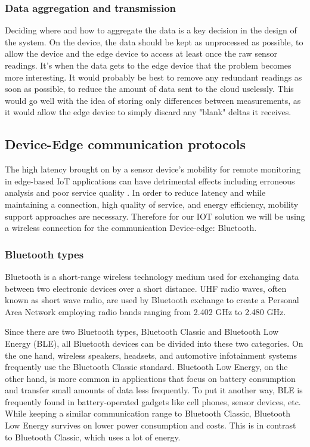 \subsubsection*{Data aggregation and transmission}
Deciding where and how to aggregate the data is a key decision in the design of the
system. On the device, the data should be kept as unprocessed as possible, to allow the device
and the edge device to access at least once the raw sensor readings. It's when the data
gets to the edge device that the problem becomes more interesting. It would probably
be best to remove any redundant readings as soon as possible, to reduce the amount of
data sent to the cloud uselessly. This would go well with the idea of storing only
differences between measurements, as it would allow the edge device to simply discard
any "blank" deltas it receives.

\subsection{Device-Edge communication protocols}
The high latency brought on by a sensor device's mobility for remote monitoring in edge-based IoT applications can have detrimental effects including erroneous analysis and poor service quality \cite{b5}. In order to reduce latency and while maintaining a connection, high quality of service, and energy efficiency, mobility support approaches are necessary. Therefore for our IOT solution we will be using a wireless connection for the communication Device-edge: Bluetooth. 
\subsubsection{Bluetooth types}
Bluetooth is a short-range wireless technology medium used for exchanging data between two electronic devices over a short distance. 
UHF radio waves, often known as short wave radio, are used by Bluetooth exchange to create a Personal Area Network employing radio bands ranging from 2.402 GHz to 2.480 GHz.

Since there are two Bluetooth types, Bluetooth Classic and Bluetooth Low Energy (BLE), all Bluetooth devices can be divided into these two categories. On the one hand, wireless speakers, headsets, and automotive infotainment systems frequently use the Bluetooth Classic standard. Bluetooth Low Energy, on the other hand, is more common in applications that focus on battery consumption and transfer small amounts of data less frequently. To put it another way, BLE is frequently found in battery-operated gadgets like cell phones, sensor devices, etc. While keeping a similar communication range to Bluetooth Classic, Bluetooth Low Energy survives on lower power consumption and costs. This is in contrast to Bluetooth Classic, which uses a lot of energy.

